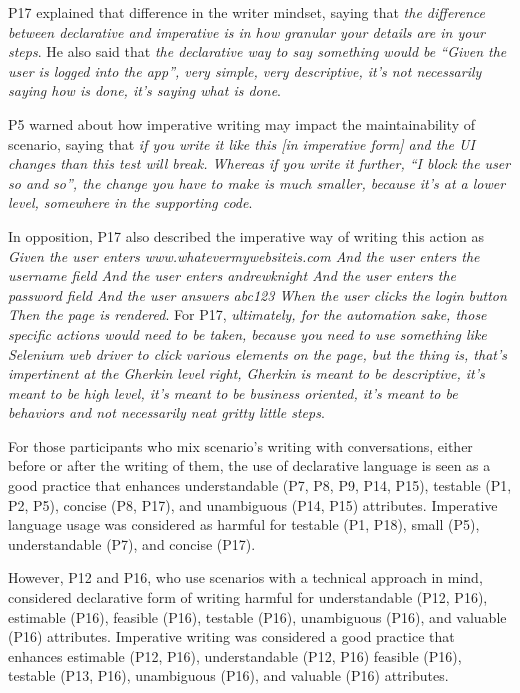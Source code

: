 P17 explained that difference in the writer mindset, saying that \textit{the difference between declarative and imperative is in how granular your details are in your steps}. He also said that \textit{the declarative way to say something would be ``Given the user is logged into the app'', very simple, very descriptive, it's not necessarily saying how is done, it's saying what is done}. 

P5 warned about how imperative writing may impact the maintainability of scenario, saying that \textit{if you write it like this [in imperative form] and the UI changes than this test will break. Whereas if you write it further, ``I block the user so and so'', the change you have to make is much smaller, because it's at a lower level, somewhere in the supporting code}.

In opposition, P17 also described the imperative way of writing this action as \textit{Given the user enters www.whatevermywebsiteis.com And the user enters the username field And the user enters andrewknight And the user enters the password field And the user answers abc123 When the user clicks the login button Then the page is rendered}. For P17,  \textit{ultimately, for the automation sake, those specific actions would need to be taken, because you need to use something like Selenium web driver to click various elements on the page, but the thing is, that's impertinent at the Gherkin level right, Gherkin is meant to be descriptive, it's meant to be high level, it's meant to be business oriented, it's meant to be behaviors and not necessarily neat gritty little steps}. 

For those participants who mix scenario's writing with conversations, either before or after the writing of them, the use of declarative language is seen as a good practice that enhances understandable (P7, P8, P9, P14, P15), testable (P1, P2, P5), concise (P8, P17), and unambiguous (P14, P15) attributes. Imperative language usage was considered as harmful for testable (P1, P18), small (P5), understandable (P7), and concise (P17). 

However, P12 and P16, who use scenarios with a technical approach in mind, considered declarative form of writing harmful for understandable (P12, P16), estimable (P16), feasible (P16), testable (P16), unambiguous (P16), and valuable (P16) attributes. Imperative writing was considered a good practice that enhances estimable (P12, P16), understandable (P12, P16) feasible (P16), testable (P13, P16), unambiguous (P16), and valuable (P16) attributes.

